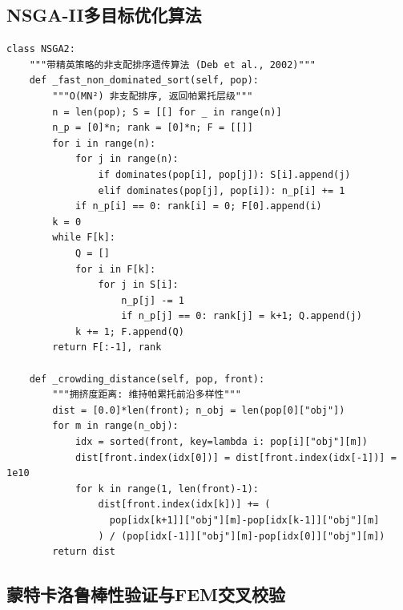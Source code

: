 \documentclass[12pt,a4paper]{ctexart}
\begin{document}
\subsection{NSGA-II多目标优化算法}

{\small
\begin{lstlisting}
class NSGA2:
    """带精英策略的非支配排序遗传算法 (Deb et al., 2002)"""
    def _fast_non_dominated_sort(self, pop):
        """O(MN²) 非支配排序, 返回帕累托层级"""
        n = len(pop); S = [[] for _ in range(n)]
        n_p = [0]*n; rank = [0]*n; F = [[]]
        for i in range(n):
            for j in range(n):
                if dominates(pop[i], pop[j]): S[i].append(j)
                elif dominates(pop[j], pop[i]): n_p[i] += 1
            if n_p[i] == 0: rank[i] = 0; F[0].append(i)
        k = 0
        while F[k]:
            Q = []
            for i in F[k]:
                for j in S[i]:
                    n_p[j] -= 1
                    if n_p[j] == 0: rank[j] = k+1; Q.append(j)
            k += 1; F.append(Q)
        return F[:-1], rank

    def _crowding_distance(self, pop, front):
        """拥挤度距离: 维持帕累托前沿多样性"""
        dist = [0.0]*len(front); n_obj = len(pop[0]["obj"])
        for m in range(n_obj):
            idx = sorted(front, key=lambda i: pop[i]["obj"][m])
            dist[front.index(idx[0])] = dist[front.index(idx[-1])] = 1e10
            for k in range(1, len(front)-1):
                dist[front.index(idx[k])] += (
                  pop[idx[k+1]]["obj"][m]-pop[idx[k-1]]["obj"][m]
                ) / (pop[idx[-1]]["obj"][m]-pop[idx[0]]["obj"][m])
        return dist
\end{lstlisting}
}

\subsection{蒙特卡洛鲁棒性验证与FEM交叉校验}
\end{document}
